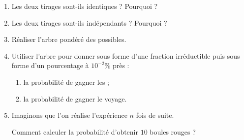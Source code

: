 \documentclass[12pt,openright,twoside,french]{book}
\begin{document}
\begin{enumerate}
    \item Les deux tirages sont-ils identiques ? Pourquoi ?
    \item Les deux tirages sont-ils indépendants ? Pourquoi ?
    \item Réaliser l'arbre pondéré des possibles.
    \item Utiliser l'arbre pour donner sous forme d'une fraction irréductible puis sous forme d'un pourcentage à $10^{-2}\%$ près :
    \begin{enumerate}
        \item la probabilité de gagner les  ;
        \item la probabilité de gagner le voyage.
    \end{enumerate}
    \item Imaginons que l'on réalise l'expérience $n$ fois de suite.\par Comment calculer la probabilité d'obtenir $10$ boules rouges ?
\end{enumerate}
\end{document}
